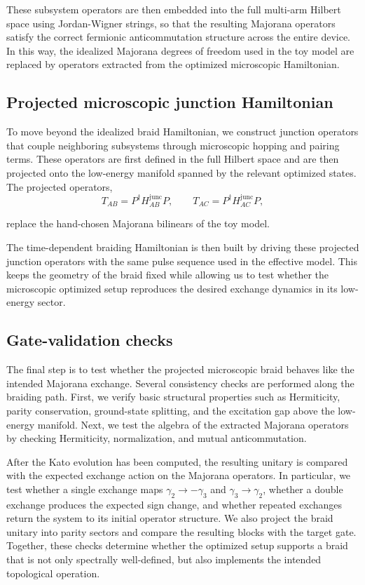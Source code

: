 These subsystem operators are then embedded into the full multi-arm Hilbert space using Jordan-Wigner strings, so that the resulting Majorana operators satisfy the correct fermionic anticommutation structure across the entire device. In this way, the idealized Majorana degrees of freedom used in the toy model are replaced by operators extracted from the optimized microscopic Hamiltonian.

\subsection{Projected microscopic junction Hamiltonian}
To move beyond the idealized braid Hamiltonian, we construct junction operators that couple neighboring subsystems through microscopic hopping and pairing terms. These operators are first defined in the full Hilbert space and are then projected onto the low-energy manifold spanned by the relevant optimized states. The projected operators,
\begin{equation}
  T_{AB} = P^\dagger H^{\mathrm{junc}}_{AB} P,
\qquad
T_{AC} = P^\dagger H^{\mathrm{junc}}_{AC} P,
\label{eq:junction_hamiltonian}
\end{equation}

replace the hand-chosen Majorana bilinears of the toy model.

The time-dependent braiding Hamiltonian is then built by driving these projected junction operators with the same pulse sequence used in the effective model. This keeps the geometry of the braid fixed while allowing us to test whether the microscopic optimized setup reproduces the desired exchange dynamics in its low-energy sector.

\subsection{Gate-validation checks}
The final step is to test whether the projected microscopic braid behaves like the intended Majorana exchange. Several consistency checks are performed along the braiding path. First, we verify basic structural properties such as Hermiticity, parity conservation, ground-state splitting, and the excitation gap above the low-energy manifold. Next, we test the algebra of the extracted Majorana operators by checking Hermiticity, normalization, and mutual anticommutation.

After the Kato evolution has been computed, the resulting unitary is compared with the expected exchange action on the Majorana operators. In particular, we test whether a single exchange maps $γ_2 \to -γ_3$ and $γ_3 \to γ_2$, whether a double exchange produces the expected sign change, and whether repeated exchanges return the system to its initial operator structure. We also project the braid unitary into parity sectors and compare the resulting blocks with the target gate. Together, these checks determine whether the optimized setup supports a braid that is not only spectrally well-defined, but also implements the intended topological operation.
